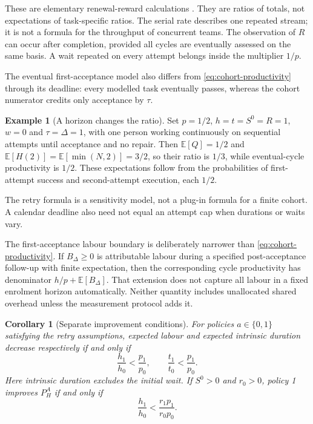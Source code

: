 \documentclass[11pt,a4paper]{amsart}
\newtheorem{corollary}[proposition]{Corollary}
\theoremstyle{definition}
\newtheorem{example}[proposition]{Example}
\theoremstyle{remark}
\newcommand{\E}{\mathbb E}
\begin{document}
These are elementary renewal-reward calculations \cite{gallager2011}. They are ratios of totals, not expectations of task-specific ratios. The serial rate describes one repeated stream; it is not a formula for the throughput of concurrent teams. The observation of $R$ can occur after completion, provided all cycles are eventually assessed on the same basis. A wait repeated on every attempt belongs inside the multiplier $1/p$.

The eventual first-acceptance model also differs from \eqref{eq:cohort-productivity} through its deadline: every modelled task eventually passes, whereas the cohort numerator credits only acceptance by $\tau$. \begin{example}[A horizon changes the ratio]\label{ex:horizon}
Set $p=1/2$, $h=t=S^0=R=1$, $w=0$ and $\tau=\Delta=1$, with one person working continuously on sequential attempts until acceptance and no repair. Then $\E[Q]=1/2$ and $\E[H(2)]=\E[\min(N,2)]=3/2$, so their ratio is $1/3$, while eventual-cycle productivity is $1/2$. These expectations follow from the probabilities of first-attempt success and second-attempt execution, each $1/2$.
\end{example}
The retry formula is a sensitivity model, not a plug-in formula for a finite cohort. A calendar deadline also need not equal an attempt cap when durations or waits vary.\par
The first-acceptance labour boundary is deliberately narrower than \eqref{eq:cohort-productivity}. If $B_\Delta\geq0$ is attributable labour during a specified post-acceptance follow-up with finite expectation, then the corresponding cycle productivity has denominator $h/p+\E[B_\Delta]$. That extension does not capture all labour in a fixed enrolment horizon automatically. Neither quantity includes unallocated shared overhead unless the measurement protocol adds it.

\begin{corollary}[Separate improvement conditions]
\label{cor:improvements}
For policies $a\in\{0,1\}$ satisfying the retry assumptions, expected labour and expected intrinsic duration decrease respectively if and only if
\begin{equation}
\label{eq:improvements}
 \frac{h_1}{h_0}<\frac{p_1}{p_0},\qquad
 \frac{t_1}{t_0}<\frac{p_1}{p_0}.
\end{equation}
Here intrinsic duration excludes the initial wait. If $S^0>0$ and $r_0>0$, policy 1 improves $P_H^A$ if and only if
\begin{equation}
\label{eq:productivity-improvement}
 \frac{h_1}{h_0}<\frac{r_1p_1}{r_0p_0}.
\end{equation}
\end{corollary}
\end{document}
